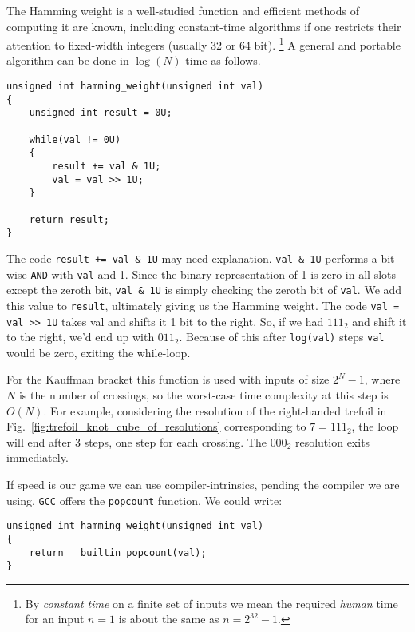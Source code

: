         The Hamming weight is a well-studied function and efficient methods of
        computing it are known, including constant-time algorithms if one
        restricts their attention to fixed-width integers
        (usually 32 or 64 bit).%
        \footnote{
            By \textit{constant time} on a finite set of inputs we mean the
            required \textit{human} time for an input $n=1$ is about the same
            as $n=2^{32}-1$.
        }
        A general and portable algorithm can be done in
        $\log(N)$ time as follows.
\begin{lstlisting}[style=CStyle]
unsigned int hamming_weight(unsigned int val)
{
    unsigned int result = 0U;

    while(val != 0U)
    {
        result += val & 1U;
        val = val >> 1U;
    }

    return result;
}
\end{lstlisting}
        The code \texttt{result += val \& 1U} may need explanation.
        \texttt{val \& 1U} performs a bit-wise \texttt{AND} with \texttt{val} and
        1. Since the binary representation of 1 is zero in all slots except the
        zeroth bit, \texttt{val \& 1U} is simply checking the zeroth bit of
        \texttt{val}. We add this value to \texttt{result}, ultimately giving
        us the Hamming weight. The code \texttt{val = val >> 1U} takes val and
        shifts it 1 bit to the right. So, if we had $111_{2}$ and shift it to
        the right, we'd end up with $011_{2}$. Because of this after
        \texttt{log(val)} steps \texttt{val} would be zero, exiting the
        while-loop.
        \par\hfill\par
        For the Kauffman bracket this function is used with inputs of size
        $2^{N}-1$, where $N$ is the number of crossings, so the worst-case
        time complexity at this step is $O(N)$. For example, considering the
        resolution of the right-handed trefoil
        in Fig.~\ref{fig:trefoil_knot_cube_of_resolutions} corresponding to
        $7=111_{2}$, the loop will end after 3 steps, one step for each
        crossing. The $000_{2}$ resolution exits immediately.
        \par\hfill\par
        If speed is our game we can use compiler-intrinsics, pending the
        compiler we are using. \texttt{GCC} offers the \texttt{popcount}
        function. We could write:
\begin{lstlisting}[style=CStyle]
unsigned int hamming_weight(unsigned int val)
{
    return __builtin_popcount(val);
}
\end{lstlisting}
